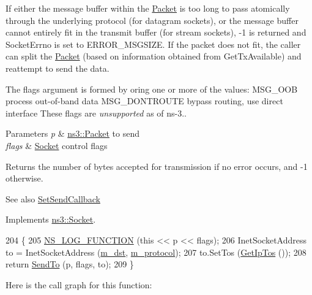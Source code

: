 If either the message buffer within the \hyperlink{classns3_1_1Packet}{Packet} is too long to pass atomically through the underlying protocol (for datagram sockets), or the message buffer cannot entirely fit in the transmit buffer (for stream sockets), -\/1 is returned and Socket\+Errno is set to E\+R\+R\+O\+R\+\_\+\+M\+S\+G\+S\+I\+ZE. If the packet does not fit, the caller can split the \hyperlink{classns3_1_1Packet}{Packet} (based on information obtained from Get\+Tx\+Available) and reattempt to send the data.

The flags argument is formed by or\textquotesingle{}ing one or more of the values\+: M\+S\+G\+\_\+\+O\+OB process out-\/of-\/band data M\+S\+G\+\_\+\+D\+O\+N\+T\+R\+O\+U\+TE bypass routing, use direct interface These flags are {\itshape unsupported} as of ns-\/3..


\begin{DoxyParams}{Parameters}
{\em p} & \hyperlink{classns3_1_1Packet}{ns3\+::\+Packet} to send \\
\hline
{\em flags} & \hyperlink{classns3_1_1Socket}{Socket} control flags \\
\hline
\end{DoxyParams}
\begin{DoxyReturn}{Returns}
the number of bytes accepted for transmission if no error occurs, and -\/1 otherwise.
\end{DoxyReturn}
\begin{DoxySeeAlso}{See also}
\hyperlink{classns3_1_1Socket_a85ff5c8cc7d242823f301b49264c68a4}{Set\+Send\+Callback} 
\end{DoxySeeAlso}


Implements \hyperlink{classns3_1_1Socket_a036901c8f485fe5b6eab93b7f2ec289d}{ns3\+::\+Socket}.


\begin{DoxyCode}
204 \{
205   \hyperlink{log-macros-disabled_8h_a90b90d5bad1f39cb1b64923ea94c0761}{NS\_LOG\_FUNCTION} (\textcolor{keyword}{this} << p << flags);
206   InetSocketAddress to = InetSocketAddress (\hyperlink{classns3_1_1Ipv4RawSocketImpl_a36a7c8ea8152272b055706247b97bef2}{m\_dst}, \hyperlink{classns3_1_1Ipv4RawSocketImpl_a924effb0eb9a6cbbf1daeb3a7b7ffc94}{m\_protocol});
207   to.SetTos (\hyperlink{classns3_1_1Socket_a95bd4732074d3d26d4a6949fc3499ccb}{GetIpTos} ());
208   \textcolor{keywordflow}{return} \hyperlink{classns3_1_1Ipv4RawSocketImpl_a06fd568d5988700a423fb2203e0aa0bf}{SendTo} (p, flags, to);
209 \}
\end{DoxyCode}


Here is the call graph for this function\+:


